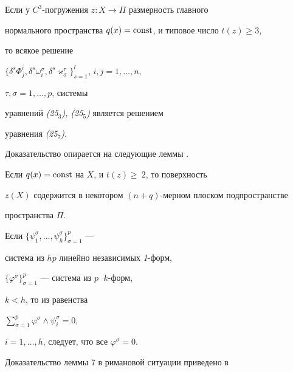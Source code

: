 \begin{thm}


Если у $C^3$-погружения $z:X\to\Pi$ размерность главного


нормального пространства $q(x)=\operatorname{const}$, и типовое число $t(z)\ge 3$,


то всякое решение


$\{\delta^s\Phi^i_j,\delta^s\omega^{\sigma}_i,


\delta^s\varkappa^{\tau}_{\sigma}\}_{s=1}^l$, $i,j=1,\dotsc,n,$


$\tau,\sigma=1,\dotsc,p$, системы


уравнений {\em (25${}_3$), (25${}_5$)} является решением


уравнения {\em (25${}_7$)}.


\end{thm}





Доказательство опирается на следующие леммы \cite{Che}.





\begin{lem}


Если $q(x)=\operatorname{const}$ на $X$, и $t(z)\ge~2$, то поверхность


$z(X)$ содержится в некотором $(n+q)$-мерном плоском подпространстве


пространства $\Pi$.


\end{lem}





\begin{lem}


Если $\{\psi^{\sigma}_1,\dotsc,\psi^{\sigma}_h\}_{\sigma=1}^p$ ---


система из $hp$ линейно независимых {\em 1}-форм,


$\{\varphi^{\sigma}\}_{\sigma=1}^p$ --- система из $p$ $\;k$-форм,


$k<h$, то из равенства


$\sum\limits_{\sigma=1}^{p}\varphi^{\sigma}\wedge\psi^{\sigma}_i=0$,


$i=1,\dotsc,h$, следует, что все $\varphi^{\sigma}=0$.


\end{lem}





Доказательство леммы 7 в римановой ситуации приведено в



